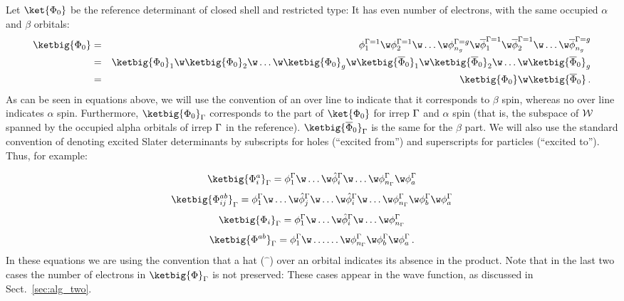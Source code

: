 \documentclass[a4paper,11pt]{article}
\begin{document}
Let $\ket{\Phi_0}$ be the reference determinant of closed shell and restricted type:
It has even number of electrons, with the same occupied $\alpha$ and $\beta$ orbitals:
\begin{eqnarray}
  \ketbig{\Phi_0}
  &=& \phi_1^{\irp=1} \w \phi_2^{\irp=1} \w
      \dots \w \phi_{n_g}^{\irp=g} \w
      \overline{\phi}_1^{\irp=1} \w \overline{\phi}_2^{\irp=1} \w
      \dots \w \overline{\phi}_{n_g}^{\irp=g}\\
  &=& \ketbig{\Phi_0}_1 \w \ketbig{\Phi_0}_2 \w
      \dots \w \ketbig{\Phi_0}_g \w
      \ketbig{\overline{\Phi}_0}_1 \w \ketbig{\overline{\Phi}_0}_2 \w
      \dots \w \ketbig{\overline{\Phi}_0}_g\\
  &=& \ketbig{\Phi_0} \w \ketbig{\overline{\Phi}_0}\,.
\end{eqnarray}
As can be seen in equations above, we will use the convention of an over line to indicate that it corresponds to $\beta$ spin, whereas no over line indicates $\alpha$ spin.
Furthermore, $\ketbig{\Phi_0}_\irp$ corresponds to the part of $\ket{\Phi_0}$ for irrep $\Gamma$ and $\alpha$ spin (that is, the subspace of $\mathcal{W}{}$ spanned by the occupied alpha orbitals of irrep $\Gamma$ in the reference).
$\ketbig{\overline{\Phi}_0}_\irp$ is the same for the $\beta$ part.
We will also use the standard convention of denoting excited Slater determinants by subscripts for holes (``excited from'') and superscripts for particles (``excited to'').
Thus, for example:

\begin{equation}
  \ketbig{\Phi_i^a}_\irp = \phi_1^\irp \w \dots \w \hat{\phi}_i^\irp \w
  \dots \w \phi_{n_\irp}^\irp \w \phi_a^\irp
\end{equation}
\begin{equation}
  \ketbig{\Phi_{ij}^{ab}}_\irp = \phi_1^\irp \w \dots
  \w \hat{\phi}_j^\irp \w \dots \w \hat{\phi}_i^\irp \w
  \dots \w \phi_{n_\irp}^\irp \w \phi_b^\irp \w \phi_a^\irp
\end{equation}
\begin{equation}
  \ketbig{\Phi_i}_\irp = \phi_1^\irp \w \dots \w \hat{\phi}_i^\irp \w
  \dots \w \phi_{n_\irp}^\irp
\end{equation}
\begin{equation}
  \ketbig{\Phi^{ab}}_\irp = \phi_1^\irp \w \dots
  \dots \w \phi_{n_\irp}^\irp \w \phi_b^\irp \w \phi_a^\irp\,.
\end{equation}
In these equations we are using the convention that a hat ($\hat{\phantom{a}}$) over an orbital indicates its absence in the product.
Note that in the last two cases the number of electrons in $\ketbig{\Phi}_\irp$ is not preserved:
These cases appear in the wave function, as discussed in Sect.~\ref{sec:alg_two}.
\end{document}
